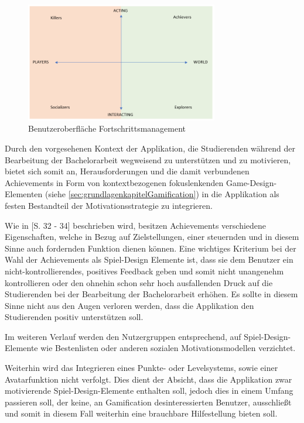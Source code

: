 \documentclass{scrreprt}
\begin{document}
\begin{figure}[H]
	\centering
	\includegraphics[width=0.75\textwidth, keepaspectratio]{Bilder/Diagramme/InterestGraphBartleAchieversExplorers.png}
	\caption{Benutzeroberfläche Fortschrittsmanagement}
	\label{img:interestGraphBartleAchiversExplorers}
\end{figure}

\par Durch den vorgesehenen Kontext der Applikation, die Studierenden während der Bearbeitung der Bachelorarbeit wegweisend zu unterstützen und zu motivieren, bietet sich somit an, Herausforderungen und die damit verbundenen Achievements in Form von kontextbezogenen fokuslenkenden Game-Design-Elementen (siehe \ref{sec:grundlagenkapitelGamification}) in die Applikation als festen Bestandteil der Motivationsstrategie zu integrieren.

\par\medskip Wie in \citep{Sailer2016}[S. 32 - 34] beschrieben wird, besitzen Achievements verschiedene Eigenschaften, welche in Bezug auf Zielstellungen, einer steuernden und in diesem Sinne auch fordernden Funktion dienen können. Eine wichtiges Kriterium bei der Wahl der Achievements als Spiel-Design Elemente ist, dass sie dem Benutzer ein nicht-kontrollierendes, positives Feedback geben und somit nicht unangenehm kontrollieren oder den ohnehin schon sehr hoch ausfallenden Druck auf die Studierenden bei der Bearbeitung der Bachelorarbeit erhöhen. Es sollte in diesem Sinne nicht aus den Augen verloren werden, dass die Applikation den Studierenden positiv unterstützen soll.

\par\medskip Im weiteren Verlauf werden den Nutzergruppen entsprechend, auf Spiel-Design-Elemente wie Bestenlisten oder anderen sozialen Motivationsmodellen verzichtet.

\par Weiterhin wird das Integrieren eines Punkte- oder Levelsystems, sowie einer Avatarfunktion nicht verfolgt. Dies dient der Absicht, dass die Applikation zwar motivierende Spiel-Design-Elemente enthalten soll, jedoch dies in einem Umfang passieren soll, der keine, an Gamification desinteressierten Benutzer, ausschließt und somit in diesem Fall weiterhin eine brauchbare Hilfestellung bieten soll.
\end{document}

